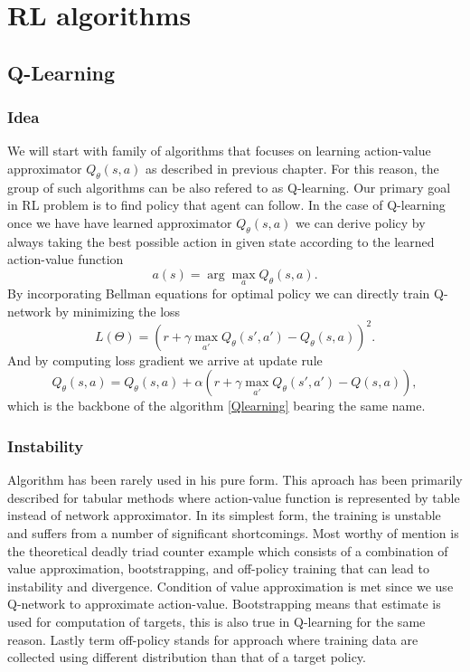 \chapter{RL algorithms}
\section{Q-Learning}

\subsection*{Idea}
We will start with family of algorithms that focuses on learning action-value approximator $Q_\theta(s,a)$ as described in previous chapter.
For this reason, the group of such algorithms can be also refered to as Q-learning.
Our primary goal in RL problem is to find policy that agent can follow.
In the case of Q-learning once we have have learned approximator $Q_\theta(s,a)$ we can derive policy by always taking the best possible action in given state according to the learned action-value function
\[a(s) = \arg \max_a Q_\theta(s,a).\]
By incorporating Bellman equations for optimal policy we can directly train Q-network by minimizing the loss
\[L(\Theta)=(r + \gamma \max_{a'} Q_\theta(s',a') - Q_\theta(s,a))^2.\]
And by computing loss gradient we arrive at update rule
\[Q_\theta(s,a) = Q_\theta(s,a) + \alpha (r + \gamma \max_{a'}Q_\theta(s',a') - Q(s,a)),\]
which is the backbone of the algorithm \ref*{Qlearning} bearing the same name.
\subsection*{Instability}
Algorithm has been rarely used in his pure form. 
This aproach has been primarily described for tabular methods where action-value function is represented by table instead of network approximator.
In its simplest form, the training is unstable and suffers from a number of significant shortcomings.
Most worthy of mention is the theoretical deadly triad counter example \cite{sutton2018reinforcement} which consists of a combination of value approximation, bootstrapping, and off-policy training that can lead to instability and divergence.
Condition of value approximation is met since we use Q-network to approximate action-value.
Bootstrapping means that estimate is used for computation of targets, this is also true in Q-learning for the same reason.
Lastly term off-policy stands for approach where training data are collected using different distribution than that of a target policy.





